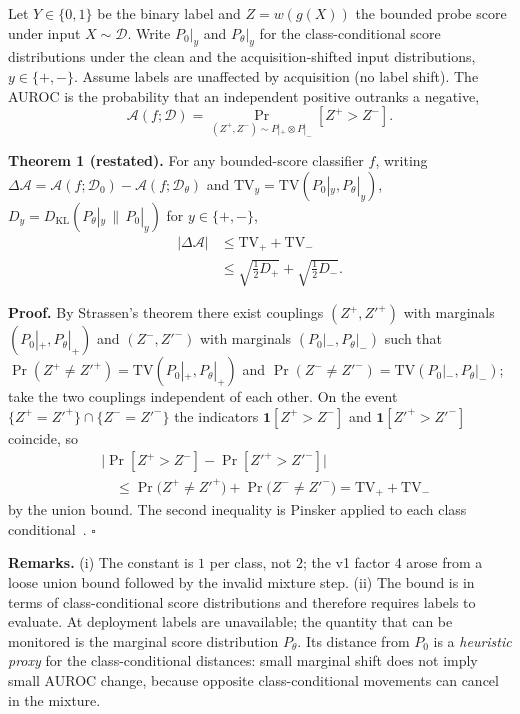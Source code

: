 \documentclass[conference]{IEEEtran}
\begin{document}
Let $Y \in \{0,1\}$ be the binary label and $Z = w(g(X))$ the bounded
probe score under input $X \sim \mathcal{D}$. Write $P_0|_{y}$ and
$P_\theta|_{y}$ for the class-conditional score distributions under the
clean and the acquisition-shifted input distributions, $y \in \{+,-\}$.
Assume labels are unaffected by acquisition (no label shift). The AUROC
is the probability that an independent positive outranks a negative,
\[
\mathcal{A}(f; \mathcal{D}) = \Pr_{(Z^+, Z^-) \sim P|_{+} \otimes
P|_{-}} [Z^+ > Z^-].
\]

\textbf{Theorem 1 (restated).} For any bounded-score classifier $f$,
writing $\Delta\mathcal{A} = \mathcal{A}(f;\mathcal{D}_0)-\mathcal{A}(f;\mathcal{D}_\theta)$
and $\mathrm{TV}_y = \mathrm{TV}(P_0|_{y},P_\theta|_{y})$,
$D_y = D_{\mathrm{KL}}(P_\theta|_{y}\,\|\,P_0|_{y})$ for $y\in\{+,-\}$,
\begin{align*}
|\Delta\mathcal{A}| &\le \mathrm{TV}_{+} + \mathrm{TV}_{-} \\
&\le \sqrt{\tfrac12 D_{+}} + \sqrt{\tfrac12 D_{-}} .
\end{align*}

\textbf{Proof.} By Strassen's theorem there exist couplings
$(Z^+, Z'^{+})$ with marginals $(P_0|_{+}, P_\theta|_{+})$ and
$(Z^-, Z'^{-})$ with marginals $(P_0|_{-}, P_\theta|_{-})$ such that
$\Pr(Z^+\neq Z'^{+}) = \mathrm{TV}(P_0|_{+},P_\theta|_{+})$ and
$\Pr(Z^-\neq Z'^{-}) = \mathrm{TV}(P_0|_{-},P_\theta|_{-})$; take the two
couplings independent of each other. On the event
$\{Z^+ = Z'^{+}\}\cap\{Z^- = Z'^{-}\}$ the indicators
$\mathbf 1[Z^+>Z^-]$ and $\mathbf 1[Z'^{+}>Z'^{-}]$ coincide, so
\begin{align*}
&\bigl|\Pr[Z^+>Z^-]-\Pr[Z'^{+}>Z'^{-}]\bigr| \\
&\quad\le \Pr\bigl(Z^+\neq Z'^{+}\bigr) + \Pr\bigl(Z^-\neq Z'^{-}\bigr)
 = \mathrm{TV}_{+} + \mathrm{TV}_{-}
\end{align*}
by the union bound. The second inequality is Pinsker applied to each
class conditional~\cite{pinsker1964information, cover2006elements}.
$\square$

\textbf{Remarks.} (i) The constant is $1$ per class, not $2$; the v1
factor $4$ arose from a loose union bound followed by the invalid
mixture step. (ii) The bound is in terms of class-conditional score
distributions and therefore requires labels to evaluate. At deployment
labels are unavailable; the quantity that can be monitored is the
marginal score distribution $P_\theta$. Its distance from $P_0$ is a
\emph{heuristic proxy} for the class-conditional distances: small
marginal shift does not imply small AUROC change, because opposite
class-conditional movements can cancel in the mixture.
\end{document}
